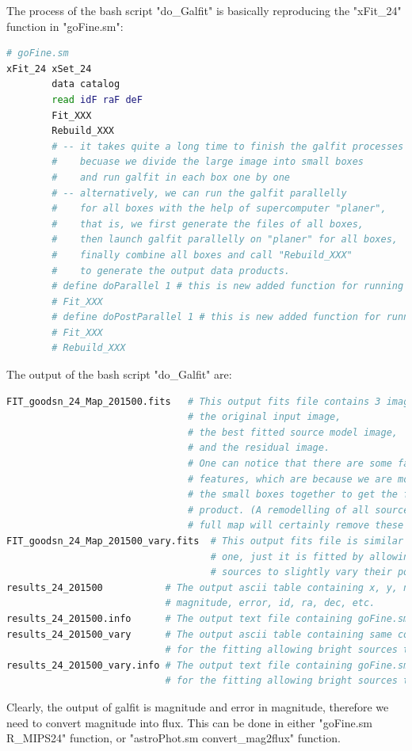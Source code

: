 \documentclass[11pt,a4paper]{article}
\begin{document}
The process of the bash script "do\_Galfit" is basically reproducing the "xFit\_24" function in "goFine.sm":

\begin{lstlisting}[language=bash]
# goFine.sm
xFit_24	xSet_24
		data catalog
		read idF raF deF
		Fit_XXX
		Rebuild_XXX
		# -- it takes quite a long time to finish the galfit processes
		#    becuase we divide the large image into small boxes 
		#    and run galfit in each box one by one
		# -- alternatively, we can run the galfit parallelly 
		#    for all boxes with the help of supercomputer "planer", 
		#    that is, we first generate the files of all boxes, 
		#    then launch galfit parallelly on "planer" for all boxes, 
		#    finally combine all boxes and call "Rebuild_XXX"
		#    to generate the output data products. 
		# define doParallel 1 # this is new added function for running parallely
		# Fit_XXX
		# define doPostParallel 1 # this is new added function for running parallely
		# Fit_XXX
		# Rebuild_XXX
\end{lstlisting}

The output of the bash script "do\_Galfit" are: 

\begin{lstlisting}[language=bash]
FIT_goodsn_24_Map_201500.fits	# This output fits file contains 3 images: 
								# the original input image, 
								# the best fitted source model image, 
								# and the residual image. 
								# One can notice that there are some faint tile 
								# features, which are because we are mosaicing all 
								# the small boxes together to get the final data 
								# product. (A remodelling of all sources over the 
								# full map will certainly remove these features.)
FIT_goodsn_24_Map_201500_vary.fits	# This output fits file is similar to the above 
									# one, just it is fitted by allowing bright 
									# sources to slightly vary their positions. 
results_24_201500			# The output ascii table containing x, y, noise (rms), 
							# magnitude, error, id, ra, dec, etc. 
results_24_201500.info		# The output text file containing goFine.sm parameter. 
results_24_201500_vary		# The output ascii table containing same columns as above, 
							# for the fitting allowing bright sources to vary positions. 
results_24_201500_vary.info	# The output text file containing goFine.sm parameters, 
							# for the fitting allowing bright sources to vary positions. 
\end{lstlisting}

Clearly, the output of galfit is magnitude and error in magnitude, 
therefore we need to convert magnitude into flux. 
This can be done in either "goFine.sm R\_MIPS24" function, 
or "astroPhot.sm convert\_mag2flux" function. 
\end{document}
